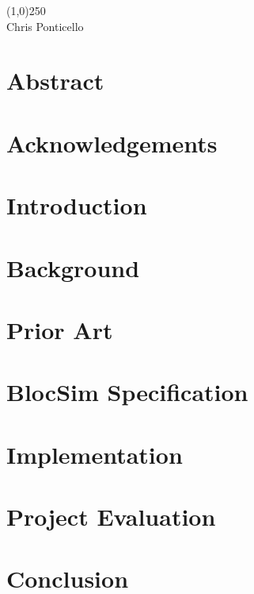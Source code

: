 \documentclass[titlesmallcaps, examinerscopy, copyrightpage]{uqthesis}
\begin{document}
\noindent \line(1,0){250} \\

\noindent Chris Ponticello


\chapter{Abstract}

\chapter{Acknowledgements}


\tableofcontents
\listoffigures
\listoftables

\mainmatter


\chapter{Introduction}

\chapter{Background}

\chapter{Prior Art}

\chapter{BlocSim Specification}

\chapter{Implementation}

\chapter{Project Evaluation}

\chapter{Conclusion}
\end{document}
